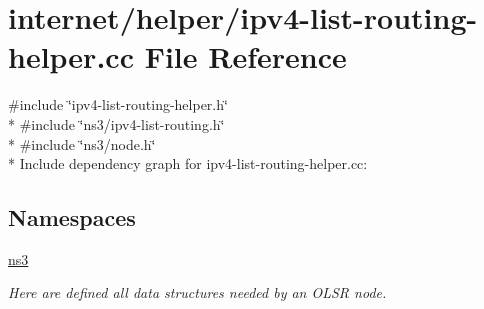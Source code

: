 \hypertarget{ipv4-list-routing-helper_8cc}{}\section{internet/helper/ipv4-\/list-\/routing-\/helper.cc File Reference}
\label{ipv4-list-routing-helper_8cc}
{\ttfamily \#include \char`\"{}ipv4-\/list-\/routing-\/helper.\+h\char`\"{}}\\*
{\ttfamily \#include \char`\"{}ns3/ipv4-\/list-\/routing.\+h\char`\"{}}\\*
{\ttfamily \#include \char`\"{}ns3/node.\+h\char`\"{}}\\*
Include dependency graph for ipv4-\/list-\/routing-\/helper.cc\+:
\subsection*{Namespaces}
\begin{DoxyCompactItemize}
\item 
 \hyperlink{namespacens3}{ns3}
\begin{DoxyCompactList}\small\item\em Here are defined all data structures needed by an O\+L\+SR node. \end{DoxyCompactList}\end{DoxyCompactItemize}
